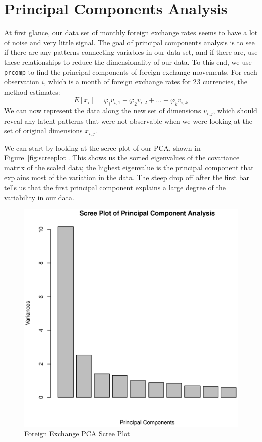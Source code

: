 \documentclass[11pt, fleqn]{article}
\begin{document}
\section{Principal Components Analysis} \label{sec:pca}

At first glance, our data set of monthly foreign exchange rates seems to have a lot of noise and very little signal. The goal of principal components analysis is to see if there are any patterns connecting variables in our data set, and if there are, use these relationships to reduce the dimensionality of our data. To this end, we use \texttt{prcomp} to find the principal components of foreign exchange movements. For each observation $i$, which is a month of foreign exchange rates for 23 currencies, the method estimates:
\begin{equation}
E[x_i] = \varphi_i v_{i,1} + \varphi_2 v_{i,2} + ... + \varphi_k v_{i,k}
\end{equation}
We can now represent the data along the new set of dimensions $v_{i,j}$, which should reveal any latent patterns that were not observable when we were looking at the set of original dimensions $x_{i,j}$.

We can start by looking at the scree plot of our PCA, shown in Figure~\vref{fig:screeplot}. This shows us the sorted eigenvalues of the covariance matrix of the scaled data; the highest eigenvalue is the principal component that explains most of the variation in the data. The steep drop off after the first bar tells us that the first principal component explains a large degree of the variability in our data.

\begin{figure}[!htb]
  \centering
  \includegraphics[scale=.5]{screeplot.eps}
  \caption{Foreign Exchange PCA Scree Plot}
  \label{fig:screeplot}
\end{figure} 
\end{document}
